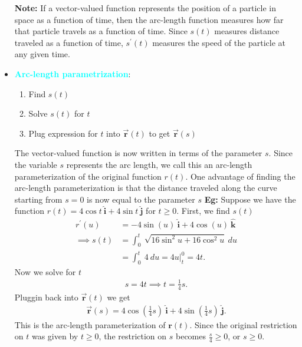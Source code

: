 \documentclass{report}
\begin{document}
\begin{itemize}
            \bigbreak \noindent 
            \textbf{Note:} If a vector-valued function represents the position of a particle in space as a function of time, then the arc-length function measures how far that particle travels as a function of time.
            \bigbreak \noindent 
            Since  $s(t)$ measures distance traveled as a function of time,  $s^{\prime}(t)$ measures the speed of the particle at any given time.
            \bigbreak \noindent 
        \item \textbf{\textcolor{cyan}{Arc-length parametrization}}:
            \begin{enumerate}
                \item Find $s(t)$
                \item Solve $s(t)$ for $t$
                \item Plug expression for $t$ into $\vec{\mathbf{r}}(t)$ to get $\vec{\mathbf{r}}(s)$
            \end{enumerate}
            The vector-valued function is now written in terms of the parameter $s$. Since the variable $s$ represents the arc length, we call this an arc-length parameterization of the original function  $r(t)$. One advantage of finding the arc-length parameterization is that the distance traveled along the curve starting from  $s=0$ is now equal to the parameter $s$
            \bigbreak \noindent 
            \textbf{Eg:} Suppose we have the function $r(t) = 4\cos{t}\ \hat{\mathbf{i}} + 4\sin{t}\ \hat{\mathbf{j}}$ for $t \geq 0$. First, we find $s(t)$
            \begin{align*}
                r^{\prime}(u) &= -4\sin{(u)}\ \hat{\mathbf{i}} + 4\cos{(u)}\ \hat{\mathbf{k}} \\
                \implies s(t) &= \int_{0}^{t}\ \sqrt{16\sin^{2}{u} + 16\cos^{2}{u}}\ du \\
                &=\int_{0}^{t}\ 4\ du =4u \bigg|^{0}_{t} = 4t 
            .\end{align*}
            Now we solve for $t$
            \begin{align*}
                s = 4t \implies t=\frac{1}{4}s
            .\end{align*}
            Pluggin back into $\vec{\mathbf{r}}(t)$ we get 
            \begin{align*}
                \vec{\mathbf{r}}(s) = 4\cos{\left(\frac{1}{4}s\right)}\ \hat{\mathbf{i}} + 4\sin{\left(\frac{1}{4}s\right)}\ \hat{\mathbf{j}}
            .\end{align*}
            This is the arc-length parameterization of $\mathbf{r}(t)$. Since the original restriction on $t$ was given by $t \geq 0$, the restriction on $s$ becomes $\frac{s}{4} \geq 0$, or $s \geq 0$.

\end{itemize}
\end{document}
